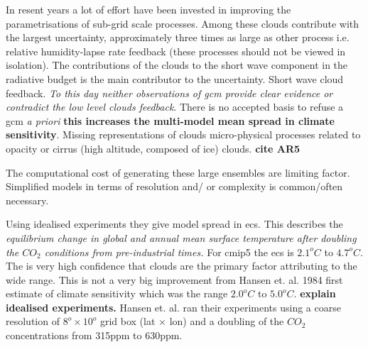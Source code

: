 
In resent years a lot of effort have been invested in improving the parametrisations of sub-grid scale processes. Among these clouds contribute with the largest uncertainty, approximately three times as large as other process i.e. relative humidity-lapse rate feedback (these processes should not be viewed in isolation). The contributions of the clouds to the short wave component in the radiative budget is the main contributor to the uncertainty. Short wave cloud feedback. \textit{To this day neither observations of \acrfull{gcm} provide clear evidence or contradict the low level clouds feedback}. There is no accepted basis to refuse a \acrshort{gcm} \textit{a priori} \textbf{this increases the multi-model mean spread in climate sensitivity}. Missing representations of clouds micro-physical processes related to opacity or cirrus (high altitude, composed of ice) clouds. \textbf{cite AR5}

The computational cost of generating these large ensembles are limiting factor. Simplified models in terms of resolution and/ or complexity is common/often necessary. 

Using idealised experiments they give model spread in \acrfull{ecs}. This describes the \textit{equilibrium change in global and annual mean surface temperature after doubling the $CO_2$ conditions from pre-industrial times.} For \acrshort{cmip5} the \acrshort{ecs} is $2.1^oC$ to $4.7^oC$. The is very high confidence that clouds are the primary factor attributing to the wide range. This is not a very big improvement from Hansen et. al. 1984 first estimate of climate sensitivity which was the range $2.0^oC$ to $5.0^oC$. \textbf{explain idealised experiments.} Hansen et. al. ran their experiments using a coarse resolution of $8^o \times 10^o$ grid box (lat $\times$ lon) and a doubling of the $CO_2$ concentrations from 315ppm to 630ppm. 

